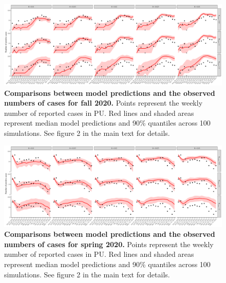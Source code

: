 \documentclass[12pt]{article}
\begin{document}
\pagebreak

\begin{figure}[!htp]
\includegraphics[width=\textwidth]{../figure_princeton_new/figure_princeton_simulation_fall_2020_all.pdf}
\caption{
\textbf{Comparisons between model predictions and the observed numbers of cases for fall 2020.}
Points represent the weekly number of reported cases in PU.
Red lines and shaded areas represent median model predictions and 90\% quantiles across 100 simulations.
See figure 2 in the main text for details.
}
\end{figure}

\pagebreak

\begin{figure}[!htp]
\includegraphics[width=\textwidth]{../figure_princeton_new/figure_princeton_simulation_spring_2020_all.pdf}
\caption{
\textbf{Comparisons between model predictions and the observed numbers of cases for spring 2020.}
Points represent the weekly number of reported cases in PU.
Red lines and shaded areas represent median model predictions and 90\% quantiles across 100 simulations.
See figure 2 in the main text for details.
}
\end{figure}


\pagebreak
\end{document}
